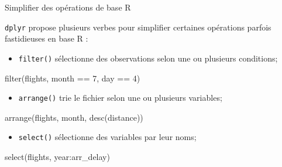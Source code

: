 \documentclass[12pt,ignorenonframetext,]{beamer}
\newenvironment{Shaded}{}{}
\newcommand{\DecValTok}[1]{#1}
\newcommand{\KeywordTok}[1]{\textcolor[rgb]{0.00,0.00,1.00}{#1}}
\newcommand{\NormalTok}[1]{#1}
\newcommand{\OperatorTok}[1]{#1}
\newcommand{\StringTok}[1]{\textcolor[rgb]{0.00,0.50,0.50}{#1}}
\providecommand{\tightlist}{%
  \setlength{\itemsep}{0pt}\setlength{\parskip}{0pt}}
\renewenvironment{Shaded}{\begin{snugshade}}{\end{snugshade}}
\begin{document}
\begin{frame}[fragile]{Simplifier des opérations de base R}
\protect\hypertarget{simplifier-des-operations-de-base-r}{}

\texttt{dplyr} propose plusieurs verbes pour simplifier certaines
opérations parfois fastidieuses en base R :

\pause \vspace{-1mm}

\begin{itemize}
\tightlist
\item
  \texttt{filter()} sélectionne des observations selon une ou plusieurs
  conditions;
\end{itemize}

\vspace{-3mm}

\begin{Shaded}
\begin{Highlighting}[]
\KeywordTok{filter}\NormalTok{(flights, month }\OperatorTok{==}\StringTok{ }\DecValTok{7}\NormalTok{, day }\OperatorTok{==}\StringTok{ }\DecValTok{4}\NormalTok{)}
\end{Highlighting}
\end{Shaded}

\pause \vspace{-3mm}

\begin{itemize}
\tightlist
\item
  \texttt{arrange()} trie le fichier selon une ou plusieurs variables;
\end{itemize}

\vspace{-3mm}

\begin{Shaded}
\begin{Highlighting}[]
\KeywordTok{arrange}\NormalTok{(flights, month, }\KeywordTok{desc}\NormalTok{(distance))}
\end{Highlighting}
\end{Shaded}

\pause \vspace{-3mm}

\begin{itemize}
\tightlist
\item
  \texttt{select()} sélectionne des variables par leur noms;
\end{itemize}

\vspace{-3mm}

\begin{Shaded}
\begin{Highlighting}[]
\KeywordTok{select}\NormalTok{(flights, year}\OperatorTok{:}\NormalTok{arr_delay)}
\end{Highlighting}
\end{Shaded}


\end{frame}
\end{document}
